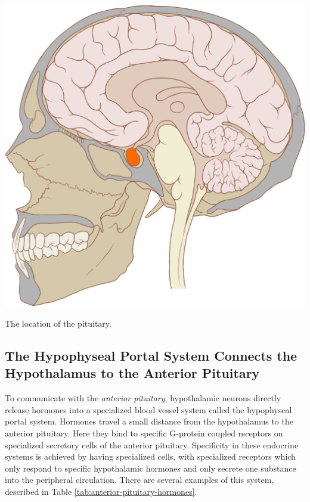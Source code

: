 \documentclass{tufte-handout}
\begin{document}
\begin{marginfigure}
  \includegraphics{figures/pituitary}
  \caption{The location of the pituitary.}
    \label{fig:pituitary}
\end{marginfigure}

\subsection{The Hypophyseal Portal System Connects the Hypothalamus to the Anterior Pituitary}

To communicate with the \emph{anterior pituitary}, hypothalamic neurons directly release hormones into a specialized blood vessel system called the hypophyseal portal system.  Hormones travel a small distance from the hypothalamus to the anterior pituitary.  Here they bind to specific G-protein coupled receptors on specialized secretory cells of the anterior pituitary.  Specificity in these endocrine systems is achieved by having specialized cells, with specialized receptors which only respond to specific hypothalamic hormones and only secrete one substance into the peripheral circulation.  There are several examples of this system, described in Table \ref{tab:anterior-pituitary-hormones}.
\end{document}
